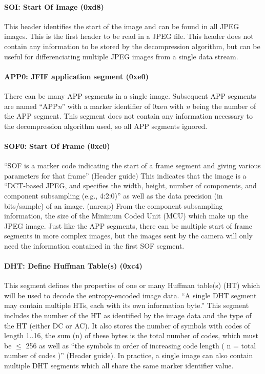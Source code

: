 \paragraph*{SOI: Start Of Image (0xd8)}
This header identifies the start of the image and can be found in all JPEG images. 
This is the first header to be read in a JPEG file. 
This header does not contain any information to be stored by the decompression algorithm, but 
can be useful for differenciating multiple JPEG images from a single data stream.

\paragraph*{APP0: JFIF application segment (0xe0)}
There can be many APP segments in a single image. 
Subsequent APP segments are named 
``APP\emph{n}'' with a marker identifier of 0xe\emph{n} with \emph{n} being the number of the APP segment. 
This segment does not contain any information necessary to the decompression algorithm used, so all APP segments ignored.

\paragraph*{SOF0: Start Of Frame (0xc0)}
``SOF is a marker code indicating the start of a frame segment and giving various parameters for that frame'' (Header guide) 
This indicates that the image is a ``DCT-based JPEG, and specifies 
the width, height, number of components, and component subsampling (e.g., 4:2:0)'' as well as the data precision (in bits/sample) of an image. 
(narcap) From the component subsampling information, the size of the Minimum Coded Unit (MCU) which make up the JPEG image. 
Just like the APP segments, there can be multiple start of frame segments in more complex images, but 
the images sent by the camera will only need the information contained in the first SOF segment.

\paragraph*{DHT: Define Huffman Table(s) (0xc4)}
This segment defines the properties of one or many Huffman table(s) (HT) which will be used to decode the entropy-encoded image data. 
``A single DHT segment may contain multiple HTs, each with its own information byte.'' 
This segment includes the number of the HT as identified by the image data and the type of the HT (either DC or AC). 
It also stores the number of symbols with codes of length 1..16, the sum (n) of these bytes is the total number of codes, 
which must be $\leq$ 256 as well as ``the symbols in order of increasing code length ( n = total number of codes )'' (Header guide). 
In practice, a single image can also contain multiple DHT segments which all share the same marker identifier value. 

